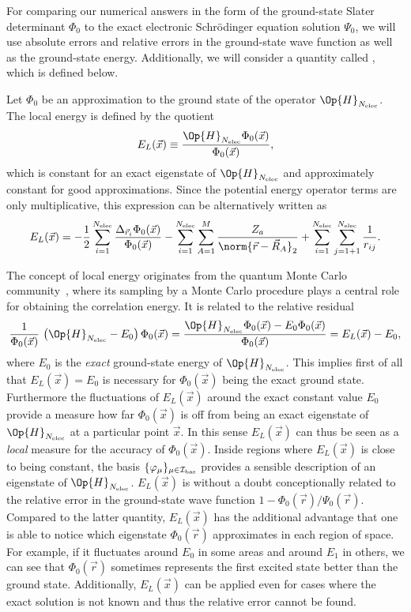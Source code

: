 For comparing our numerical answers in the form of the \HF
ground-state Slater determinant $\Phi_0$
to the exact electronic Schrödinger equation solution $\Psi_0$,
we will use absolute errors and relative errors in the ground-state wave function
as well as the ground-state energy.
Additionally, we will consider a quantity called ,
which is defined below.
\begin{defn}
	Let $\Phi_0$ be an approximation to the ground state
	of the operator $\Op{H}_{\Nelec}$.
	The local energy is defined by the quotient
	\begin{equation}
		E_L(\vec{x}) \equiv \frac{\Op{H}_{\Nelec} \Phi_0(\vec{x})}{\Phi_0(\vec{x})},
		\label{eqn:LocalEnergy}
	\end{equation}
	which is constant for an exact eigenstate of $\Op{H}_{\Nelec}$
	and approximately constant for good approximations.
	Since the potential energy operator terms are only multiplicative,
	this expression can be alternatively written as
	\[
		E_L(\vec{x})
		= -\frac12 \sum_{i=1}^{\Nelec} \frac{\Delta_{\vec{r}_i} \Phi_0(\vec{x})}{\Phi_0(\vec{x})}
		- \sum_{i=1}^{\Nelec} \sum_{A=1}^M \frac{Z_a}{\norm{\vec{r} - \vec{R}_A}_2}
		+ \sum_{i=1}^{\Nelec} \sum_{j=1+1}^{\Nelec} \frac{1}{r_{ij}}.
	\]
\end{defn}
The concept of local energy originates from the
quantum Monte Carlo community~\cite{Foulkes2001,Ma2005},
where its sampling by a Monte Carlo procedure plays a central role
for obtaining the correlation energy.
It is related to the relative residual
\[
	\frac{1}{\Phi_0(\vec{x})} \, \left(\Op{H}_{\Nelec} - E_0\right) \Phi_0(\vec{x}) =
	\frac{\Op{H}_{\Nelec} \Phi_0(\vec{x}) - E_0 \Phi_0(\vec{x})}{\Phi_0(\vec{x})}
	= E_L(\vec{x}) - E_0,
\]
where $E_0$ is the \emph{exact} ground-state energy of $\Op{H}_{\Nelec}$.
This implies first of all
that $E_L(\vec{x}) = E_0$ is necessary for $\Phi_0(\vec{x})$ being the exact ground state.
Furthermore the fluctuations of $E_L(\vec{x})$ around the exact constant value $E_0$
provide a measure how far $\Phi_0(\vec{x})$ is off from being an
exact eigenstate of $\Op{H}_{\Nelec}$ at a particular point $\vec{x}$.
In this sense $E_L(\vec{x})$ can thus be seen as a \emph{local} measure
for the accuracy of $\Phi_0(\vec{x})$.
Inside regions where $E_L(\vec{x})$ is close to being constant,
the basis $\{\varphi_\mu\}_{\mu\in\mathcal{I}_\text{bas}}$ provides a sensible description
of an eigenstate of $\Op{H}_{\Nelec}$.
$E_L(\vec{x})$ is without a doubt conceptionally related to the
relative error in the ground-state wave function $1 - \Phi_0(\vec{r}) / \Psi_0(\vec{r})$.
Compared to the latter quantity, $E_L(\vec{x})$
has the additional advantage that one is able to notice
which eigenstate $\Phi_0(\vec{r})$ approximates in each region of space.
For example, if it fluctuates around $E_0$ in some areas and around $E_1$ in others,
we can see that $\Phi_0(\vec{r})$ sometimes represents the first excited state
better than the ground state.
Additionally, $E_L(\vec{x})$ can be applied even for cases where
the exact solution is not known and thus the relative error cannot be found.

